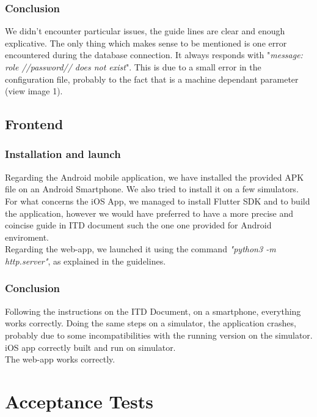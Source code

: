 \documentclass{article}
\begin{document}
\subsubsection{Conclusion}
We didn't encounter particular issues, the guide lines are clear and enough explicative.\newline
The only thing which makes sense to be mentioned is one error encountered during the database connection. It always responds with "\textit{message: role //password// does not exist}". This is due to a small error in the configuration file, probably to the fact that is a machine dependant parameter (view image 1).

\newpage	
\subsection{Frontend}
\subsubsection{Installation and launch}
Regarding the Android mobile application, we have installed the provided APK file on an Android Smartphone. We also tried to install it on a few simulators.\newline
\\For what concerns the iOS App, we managed to install Flutter SDK and to build the application, however we would have preferred to have a more precise and coincise guide in ITD document such the one one provided for Android enviroment. \newline
\\Regarding the web-app, we launched it using the command \textit{"python3 -m http.server"}, as explained in the guidelines.

\subsubsection{Conclusion}
Following the instructions on the ITD Document, on a smartphone, everything works correctly.
Doing the same steps on a simulator, the application crashes, probably due to some incompatibilities with the running version on the simulator.	\newline
\\ iOS app correctly built and run on simulator.\newline
\\The web-app works correctly.

\newpage
\section{Acceptance Tests}
\end{document}
